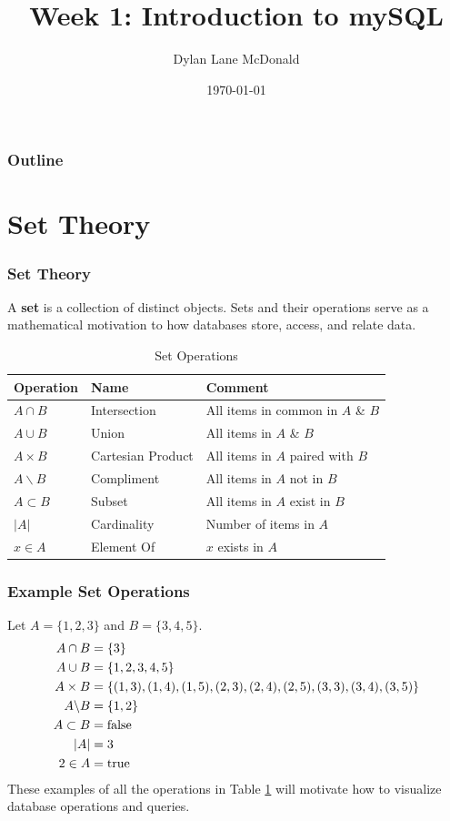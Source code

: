 \documentclass[aspectratio=169]{beamer}
\title{Week 1: Introduction to mySQL}
\author{Dylan Lane McDonald}
\institute{CNM STEMulus Center\\Web Development with PHP}
\date{\today}
\begin{document}
\lstset{language=Java}
\begin{frame}
\titlepage
\end{frame}

\begin{frame}
\frametitle{Outline}
\tableofcontents
\end{frame}

\section{Set Theory}
\begin{frame}
\frametitle{Set Theory}
A \textbf{set} is a collection of distinct objects. Sets and their operations serve as a mathematical motivation to how databases store, access, and relate data.
\begin{table}
\begin{tabular}{|l|l|l|}
\hline
\textbf{Operation} & \textbf{Name} & \textbf{Comment}\\
\hline
$A \cap B$ & Intersection & All items in common in $A$ \& $B$\\
\hline
$A \cup B$ & Union & All items in $A$ \& $B$\\
\hline
$A \times B$ & Cartesian Product & All items in $A$ paired with $B$\\
\hline
$A \backslash B$ & Compliment & All items in $A$ not in $B$\\
\hline
$A \subset B$ & Subset & All items in $A$ exist in $B$\\
\hline
$\left| A \right|$ & Cardinality & Number of items in $A$\\
\hline
$x \in A$ & Element Of & $x$ exists in $A$\\
\hline
\end{tabular}
\caption{Set Operations}
\label{tbl:setoperations}
\end{table}
\end{frame}

\begin{frame}
\frametitle{Example Set Operations}
Let $A = \{1, 2, 3\}$ and $B = \{3, 4, 5\}$.
\begin{align*}
A \cap B &= \{3\}\\
A \cup B &= \{1, 2, 3, 4, 5 \}\\
A \times B &= \{(1, 3), (1, 4), (1, 5), (2, 3), (2, 4), (2, 5), (3, 3), (3, 4), (3, 5)\}\\
A \backslash B &= \{1, 2\}\\
A \subset B &= \textnormal{false}\\
\left| A \right| &= 3\\
2 \in A &= \textnormal{true}
\end{align*}
These examples of all the operations in Table \ref{tbl:setoperations} will motivate how to visualize database operations and queries.
\end{frame}
\end{document}
